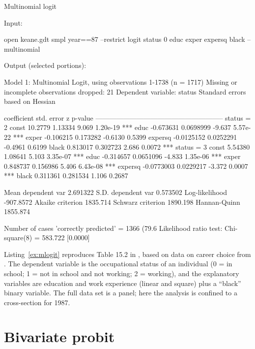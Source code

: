 \begin{script}[htbp]
  \caption{Multinomial logit}
  \label{ex:mlogit}
Input:
\begin{scodebit}
open keane.gdt
smpl year==87 --restrict
logit status 0 educ exper expersq black --multinomial
\end{scodebit}
Output (selected portions):
\begin{scodebit}
Model 1: Multinomial Logit, using observations 1-1738 (n = 1717)
Missing or incomplete observations dropped: 21
Dependent variable: status
Standard errors based on Hessian

             coefficient   std. error      z      p-value 
  --------------------------------------------------------
  status = 2
  const      10.2779       1.13334       9.069    1.20e-19 ***
  educ       -0.673631     0.0698999    -9.637    5.57e-22 ***
  exper      -0.106215     0.173282     -0.6130   0.5399  
  expersq    -0.0125152    0.0252291    -0.4961   0.6199  
  black       0.813017     0.302723      2.686    0.0072   ***
  status = 3
  const       5.54380      1.08641       5.103    3.35e-07 ***
  educ       -0.314657     0.0651096    -4.833    1.35e-06 ***
  exper       0.848737     0.156986      5.406    6.43e-08 ***
  expersq    -0.0773003    0.0229217    -3.372    0.0007   ***
  black       0.311361     0.281534      1.106    0.2687  

Mean dependent var   2.691322   S.D. dependent var   0.573502
Log-likelihood      -907.8572   Akaike criterion     1835.714
Schwarz criterion    1890.198   Hannan-Quinn         1855.874

Number of cases 'correctly predicted' = 1366 (79.6%
Likelihood ratio test: Chi-square(8) = 583.722 [0.0000]  
\end{scodebit}
\end{script}

Listing~\ref{ex:mlogit} reproduces Table 15.2 in
\cite{wooldridge-panel}, based on data on career choice from
\cite{keane97}.  The dependent variable is the occupational status of
an individual (0 = in school; 1 = not in school and not working; 2 =
working), and the explanatory variables are education and work
experience (linear and square) plus a ``black'' binary variable.  The
full data set is a panel; here the analysis is confined to a
cross-section for 1987. 

\section{Bivariate probit}
\label{sec:biprobit}

